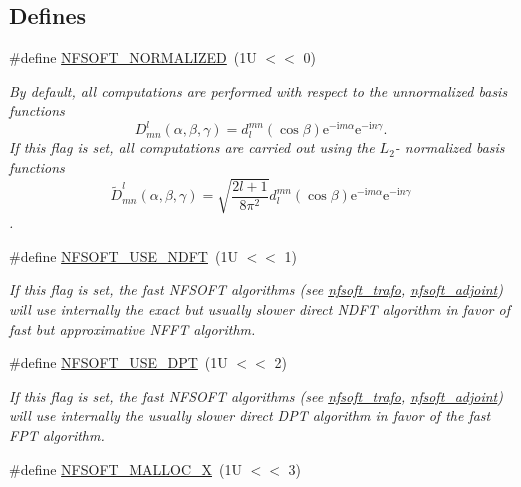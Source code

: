 \subsection*{Defines}
\begin{CompactItemize}
\item 
\#define \hyperlink{group__nfsoft_g8c53e32dd194bda4a828c15ad044d44a}{NFSOFT\_\-NORMALIZED}~(1U $<$$<$ 0)
\begin{CompactList}\small\item\em By default, all computations are performed with respect to the unnormalized basis functions \[ D_{mn}^l(\alpha,\beta,\gamma) = d^{mn}_{l}(\cos\beta) \mathrm{e}^{-\mathrm{i} m \alpha}\mathrm{e}^{-\mathrm{i} n \gamma}. \] If this flag is set, all computations are carried out using the $L_2$- normalized basis functions \[ \tilde D_{mn}^l(\alpha,\beta,\gamma) = \sqrt{\frac{2l+1}{8\pi^2}}d^{mn}_{l}(\cos\beta) \mathrm{e}^{-\mathrm{i} m \alpha}\mathrm{e}^{-\mathrm{i} n \gamma} \]. \item\end{CompactList}\item 
\#define \hyperlink{group__nfsoft_g14cae92f8ee539b4a41aebdf913ef2c5}{NFSOFT\_\-USE\_\-NDFT}~(1U $<$$<$ 1)
\begin{CompactList}\small\item\em If this flag is set, the fast NFSOFT algorithms (see \hyperlink{group__nfsoft_ge243cd75d7571a99eae53818e32355fb}{nfsoft\_\-trafo}, \hyperlink{group__nfsoft_g08395b1dd90f9a2565685d17460afc5b}{nfsoft\_\-adjoint}) will use internally the exact but usually slower direct NDFT algorithm in favor of fast but approximative NFFT algorithm. \item\end{CompactList}\item 
\#define \hyperlink{group__nfsoft_g619b249b5d4b4675d2ce9a17d7817590}{NFSOFT\_\-USE\_\-DPT}~(1U $<$$<$ 2)
\begin{CompactList}\small\item\em If this flag is set, the fast NFSOFT algorithms (see \hyperlink{group__nfsoft_ge243cd75d7571a99eae53818e32355fb}{nfsoft\_\-trafo}, \hyperlink{group__nfsoft_g08395b1dd90f9a2565685d17460afc5b}{nfsoft\_\-adjoint}) will use internally the usually slower direct DPT algorithm in favor of the fast FPT algorithm. \item\end{CompactList}\item 
\#define \hyperlink{group__nfsoft_gbe0d04599c1b06144e9a66fc2ac7b09d}{NFSOFT\_\-MALLOC\_\-X}~(1U $<$$<$ 3)

\end{CompactItemize}
